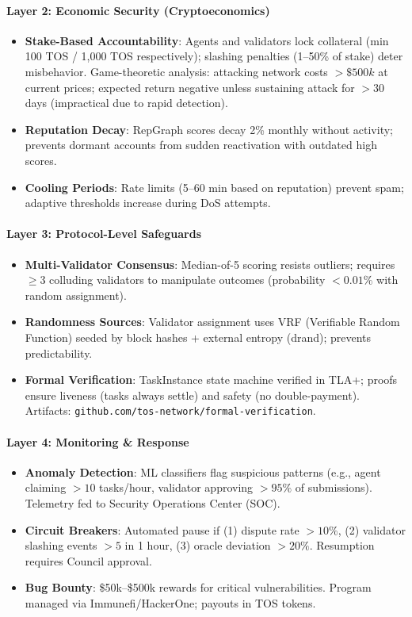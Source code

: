 \documentclass[11pt]{article}
\begin{document}
\paragraph{Layer 2: Economic Security (Cryptoeconomics)}
\begin{itemize}[noitemsep]
  \item \textbf{Stake-Based Accountability}: Agents and validators lock collateral (min 100 TOS / 1,000 TOS respectively); slashing penalties (1--50\% of stake) deter misbehavior. Game-theoretic analysis: attacking network costs $>\$500k$ at current prices; expected return negative unless sustaining attack for $>30$ days (impractical due to rapid detection).
  \item \textbf{Reputation Decay}: RepGraph scores decay 2\% monthly without activity; prevents dormant accounts from sudden reactivation with outdated high scores.
  \item \textbf{Cooling Periods}: Rate limits (5--60 min based on reputation) prevent spam; adaptive thresholds increase during DoS attempts.
\end{itemize}

\paragraph{Layer 3: Protocol-Level Safeguards}
\begin{itemize}[noitemsep]
  \item \textbf{Multi-Validator Consensus}: Median-of-5 scoring resists outliers; requires $\geq3$ colluding validators to manipulate outcomes (probability $<0.01\%$ with random assignment).
  \item \textbf{Randomness Sources}: Validator assignment uses VRF (Verifiable Random Function) seeded by block hashes + external entropy (drand); prevents predictability.
  \item \textbf{Formal Verification}: TaskInstance state machine verified in TLA+; proofs ensure liveness (tasks always settle) and safety (no double-payment). Artifacts: \texttt{github.com/tos-network/formal-verification}.
\end{itemize}

\paragraph{Layer 4: Monitoring \& Response}
\begin{itemize}[noitemsep]
  \item \textbf{Anomaly Detection}: ML classifiers flag suspicious patterns (e.g., agent claiming $>10$ tasks/hour, validator approving $>95\%$ of submissions). Telemetry fed to Security Operations Center (SOC).
  \item \textbf{Circuit Breakers}: Automated pause if (1) dispute rate $>10\%$, (2) validator slashing events $>5$ in 1 hour, (3) oracle deviation $>20\%$. Resumption requires Council approval.
  \item \textbf{Bug Bounty}: \$50k--\$500k rewards for critical vulnerabilities. Program managed via Immunefi/HackerOne; payouts in TOS tokens.
\end{itemize}
\end{document}
